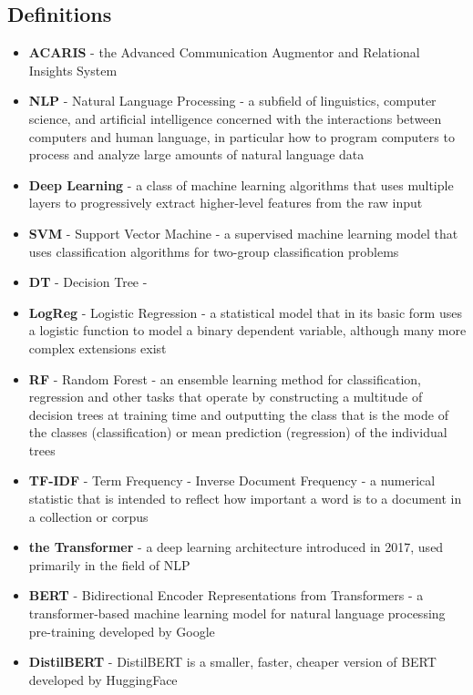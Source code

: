 \documentclass{article}
\begin{document}
\subsection{Definitions}
\begin{itemize}
	\item \textbf{ACARIS} - the Advanced Communication Augmentor and Relational Insights System
	\item \textbf{NLP} - Natural Language Processing - a subfield of linguistics, computer science, and artificial intelligence concerned with the interactions between computers and human language, in particular how to program computers to process and analyze large amounts of natural language data
	\item \textbf{Deep Learning} - a class of machine learning algorithms that uses multiple layers to progressively extract higher-level features from the raw input
	\item \textbf{SVM} - Support Vector Machine - a supervised machine learning model that uses classification algorithms for two-group classification problems
	\item \textbf{DT} - Decision Tree - 
	\item \textbf{LogReg} - Logistic Regression - a statistical model that in its basic form uses a logistic function to model a binary dependent variable, although many more complex extensions exist
	\item \textbf{RF} - Random Forest - an ensemble learning method for classification, regression and other tasks that operate by constructing a multitude of decision trees at training time and outputting the class that is the mode of the classes (classification) or mean prediction (regression) of the individual trees
	\item \textbf{TF-IDF} - Term Frequency - Inverse Document Frequency - a numerical statistic that is intended to reflect how important a word is to a document in a collection or corpus
	\item \textbf{the Transformer} - a deep learning architecture introduced in 2017, used primarily in the field of NLP\cite{vaswani2017attention}
	\item \textbf{BERT} - Bidirectional Encoder Representations from Transformers - a transformer-based machine learning model for natural language processing pre-training developed by Google\cite{devlin2019bert}
	\item \textbf{DistilBERT} - DistilBERT is a smaller, faster, cheaper version of BERT developed by HuggingFace\cite{sanh2020distilbert}

\end{itemize}
\end{document}
